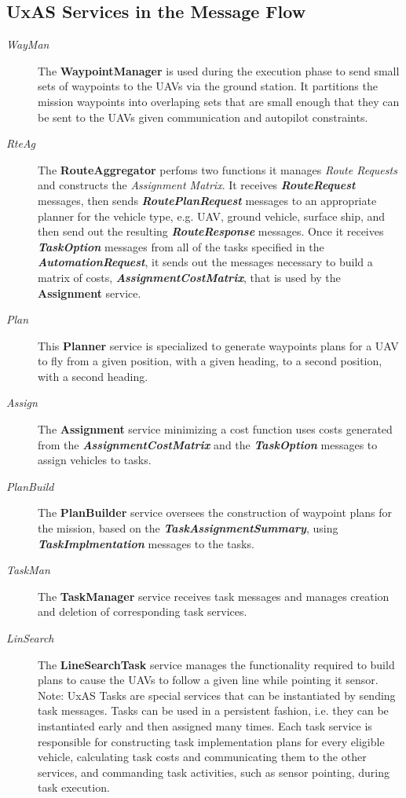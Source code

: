 \subsection{UxAS Services in the Message Flow}
\begin{description}
	\item[\textit{WayMan}] The \textbf{WaypointManager} is used during the execution phase to send small sets of waypoints to the UAVs via the ground station. It partitions the mission waypoints into overlaping sets that are small enough that they can be sent to the UAVs given communication and autopilot constraints.
	\item[\textit{RteAg}] The \textbf{RouteAggregator} perfoms two functions it manages \textit{Route Requests} and constructs the \textit{Assignment Matrix}. It receives \textbf{\textit{RouteRequest}} messages, then sends \textbf{\textit{RoutePlanRequest}} messages to an appropriate planner for the vehicle type, e.g. UAV, ground vehicle, surface ship, and then send out the resulting \textbf{\textit{RouteResponse}} messages. Once it receives \textbf{\textit{TaskOption}} messages from all of the tasks specified in the \textbf{\textit{AutomationRequest}}, it sends out the messages necessary to build a matrix of costs, \textbf{\textit{AssignmentCostMatrix}}, that is used by the \textbf{Assignment} service. 
	\item[\textit{Plan}] This \textbf{Planner} service is specialized to generate waypoints plans for a UAV to fly from a given position, with a given heading, to a second position, with a second heading. 
	\item[\textit{Assign}] The \textbf{Assignment} service minimizing a cost function uses costs generated from the \textbf{\textit{AssignmentCostMatrix}} and the \textbf{\textit{TaskOption}} messages to assign vehicles to tasks.
	\item[\textit{PlanBuild}] The \textbf{PlanBuilder} service oversees the construction of waypoint plans for the mission, based on the \textbf{\textit{TaskAssignmentSummary}}, using \textbf{\textit{TaskImplmentation}} messages to the tasks. 
	\item[\textit{TaskMan}] The \textbf{TaskManager} service receives task messages and manages creation and deletion of corresponding task services.
	\item[\textit{LinSearch}] The \textbf{LineSearchTask} service manages the functionality required to build plans to cause the UAVs to follow a given line while pointing it sensor. Note: UxAS Tasks are special services that can be instantiated by sending task messages. Tasks can be used in a persistent fashion, i.e. they can be instantiated early and then assigned many times. Each task service is responsible for constructing task implementation plans for every eligible vehicle, calculating task costs and communicating them to the other services, and commanding task activities, such as sensor pointing, during task execution.
	 
\end{description}

